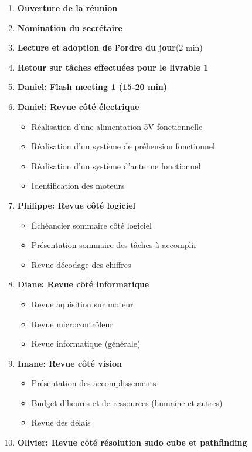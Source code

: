 \documentclass[12pt]{ULojpv}
\begin{document}
\entete
\begin{enumerate}
   \item \textbf{Ouverture de la réunion}
   \item \textbf{Nomination du secrétaire}
   \item \textbf{Lecture et adoption de l'ordre du jour}(2 min)
   \item \textbf{Retour sur tâches effectuées pour le livrable 1}
   \item \textbf{Daniel: Flash meeting 1 (15-20 min)} 
   \item \textbf{Daniel: Revue côté électrique}
   \begin{itemize}
   \item Réalisation d'une alimentation 5V fonctionnelle 
   \item Réalisation d'un système de préhension fonctionnel
   \item Réalisation d'un système d'antenne fonctionnel
   \item Identification des moteurs
   \end{itemize}
   \item \textbf{Philippe: Revue côté logiciel}
   \begin{itemize}
   \item Échéancier sommaire côté logiciel
   \item Présentation sommaire des tâches à accomplir
   \item Revue décodage des chiffres
   \end{itemize}
   \item \textbf{Diane: Revue côté informatique}
   \begin{itemize}
   \item Revue aquisition sur moteur
   \item Revue microcontrôleur
   \item Revue informatique (générale)
   \end{itemize}
   \item\textbf{Imane: Revue côté vision}
   \begin{itemize}
   \item Présentation des accomplissements
   \item Budget d'heures et de ressources (humaine et autres)
   \item Revue des délais
   \end{itemize}
   \item\textbf{Olivier: Revue côté résolution sudo cube et pathfinding}
   \begin{itemize}

\end{itemize}
\end{enumerate}
\end{document}
